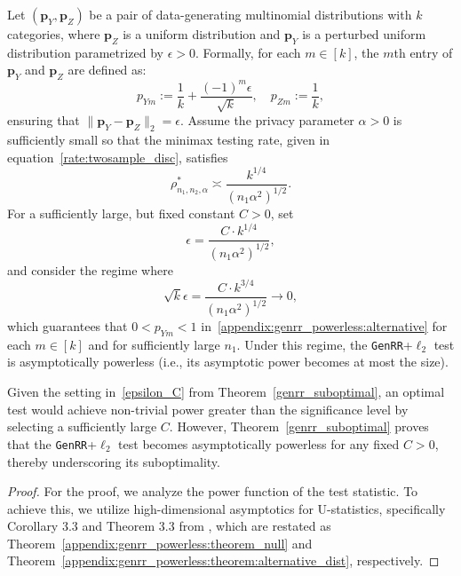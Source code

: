 \documentclass[twoside,11pt]{article}
\newcommand{\rvTwo}{Y}
\newcommand{\rvThree}{Z}
\newcommand{\alphabetSize}{k} %
\newcommand{\vectorIndex}{m}
\newcommand{\sampleSize}{n}
\newcommand{\probVecElement}[2]{p_{{#1}{#2}}}
\newcommand{\probVec}{\mathbf{p}} %
\newcommand{\privacyParameter}{\alpha} %
\begin{document}
\begin{appendix}
	\begin{theorem}\label{genrr_suboptimal}
		Let $(\probVec_\rvTwo, \probVec_\rvThree)$ be a pair of  data-generating multinomial distributions with $\alphabetSize$ categories, where  $\probVec_\rvThree$ is a uniform distribution and $\probVec_\rvTwo$ is a perturbed uniform distribution parametrized by $\epsilon > 0$. Formally, for each $\vectorIndex \in [ \alphabetSize]$, the $m$th entry of $\probVec_\rvTwo$ and $\probVec_\rvThree$ are defined as:
		\begin{equation}\label{appendix:genrr_powerless:alternative}
			\probVecElement{\rvTwo}{\vectorIndex} := \frac{1}{\alphabetSize} + \frac{(-1)^\vectorIndex \epsilon}{\sqrt{\alphabetSize}}, \quad
			\probVecElement{\rvThree}{\vectorIndex} := \frac{1}{\alphabetSize},
		\end{equation}
		ensuring that $\|\probVec_\rvTwo - \probVec_\rvThree\|_2 = \epsilon$.
		Assume the privacy parameter $ \privacyParameter > 0 $ is sufficiently small so that the minimax testing rate, given in equation~\eqref{rate:twosample_disc}, satisfies
		\begin{equation}
			\rho^\ast_{\sampleSize_1, \sampleSize_2, \privacyParameter} \asymp \frac{\alphabetSize^{1/4}}{(\sampleSize_1 \privacyParameter^2)^{1/2}}.
		\end{equation}
		\noindent
		For a sufficiently large, but fixed constant $C >0$, set
		\begin{equation}\label{epsilon_C}
			\epsilon = \frac{C \cdot \alphabetSize^{1/4}}{(\sampleSize_1 \privacyParameter^2)^{1/2}},
		\end{equation}
		and consider the regime where
		\begin{equation}\label{appendix:genrr_powerless:asymptotic_regime}
			\sqrt{\alphabetSize} \epsilon = \frac{C \cdot \alphabetSize^{3/4}}{(\sampleSize_1 \privacyParameter^2)^{1/2}} \to 0,
		\end{equation}
		which guarantees that $0 < \probVecElement{\rvTwo}{\vectorIndex} < 1$  in~\eqref{appendix:genrr_powerless:alternative} for each $\vectorIndex \in [\alphabetSize]$ and for sufficiently large $\sampleSize_1$. Under this regime, the \textnormal{\texttt{GenRR}}+$\ell_2$ test is asymptotically powerless (i.e., its asymptotic power becomes at most the size). 
	\end{theorem}
	Given the setting in~\eqref{epsilon_C} from Theorem~\ref{genrr_suboptimal}, an optimal test would achieve non-trivial power greater than the significance level by selecting a sufficiently large $C$. However, Theorem~\ref{genrr_suboptimal} proves that the \textnormal{\texttt{GenRR}}+$\ell_2$ test becomes asymptotically powerless for any fixed $C > 0$, thereby underscoring its suboptimality.
	\begin{proof} For the proof,
		we analyze the power function of the test statistic. To achieve this, we utilize high-dimensional asymptotics for U-statistics, specifically Corollary 3.3 and Theorem 3.3 from \citet{kim_multinomial_2020}, which are restated as Theorem~\ref{appendix:genrr_powerless:theorem_null} and Theorem~\ref{appendix:genrr_powerless:theorem:alternative_dist}, respectively.
		

\end{proof}
\end{appendix}
\end{document}
